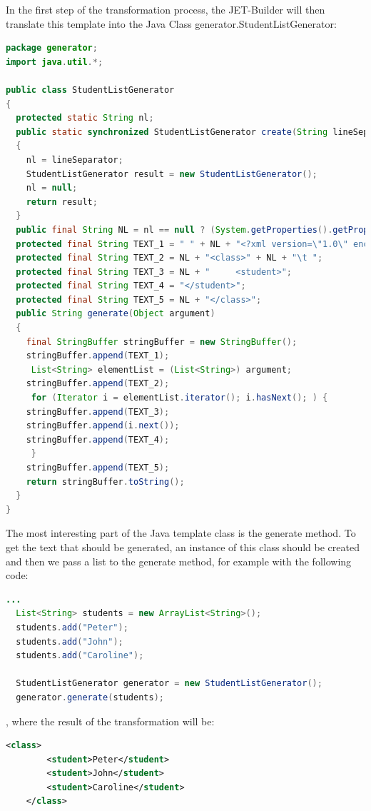 In the first step of the transformation process, the JET-Builder will then translate this template into the Java Class generator.StudentListGenerator:
\begin{lstlisting}[caption = The Translated Java-Class, language = Java]
package generator;
import java.util.*;

public class StudentListGenerator
{
  protected static String nl;
  public static synchronized StudentListGenerator create(String lineSeparator)
  {
    nl = lineSeparator;
    StudentListGenerator result = new StudentListGenerator();
    nl = null;
    return result;
  }
  public final String NL = nl == null ? (System.getProperties().getProperty("line.separator")) : nl;
  protected final String TEXT_1 = " " + NL + "<?xml version=\"1.0\" encoding=\"UTF-8\"?>";
  protected final String TEXT_2 = NL + "<class>" + NL + "\t ";
  protected final String TEXT_3 = NL + "     <student>";
  protected final String TEXT_4 = "</student>";
  protected final String TEXT_5 = NL + "</class>";
  public String generate(Object argument)
  {
    final StringBuffer stringBuffer = new StringBuffer();
    stringBuffer.append(TEXT_1);
     List<String> elementList = (List<String>) argument; 
    stringBuffer.append(TEXT_2);
     for (Iterator i = elementList.iterator(); i.hasNext(); ) { 
    stringBuffer.append(TEXT_3);
    stringBuffer.append(i.next());
    stringBuffer.append(TEXT_4);
     } 
    stringBuffer.append(TEXT_5);
    return stringBuffer.toString();
  }
}

\end{lstlisting}
The most interesting part of the Java template class is the generate method. To get the text that should be generated, an instance of this class should be created and then we pass a list to the generate method, for example with the following code:
\begin{lstlisting}[caption = An example Java code calling the generate method, language = Java]
  ...
  List<String> students = new ArrayList<String>();
  students.add("Peter");
  students.add("John");
  students.add("Caroline");
  
  StudentListGenerator generator = new StudentListGenerator();
  generator.generate(students);
\end{lstlisting}

, where the result of the transformation will be:
\begin{lstlisting}[caption = Result String of the Transformation, language = xml]
	<class>
		<student>Peter</student>
		<student>John</student>
		<student>Caroline</student>
	</class>
\end{lstlisting}

